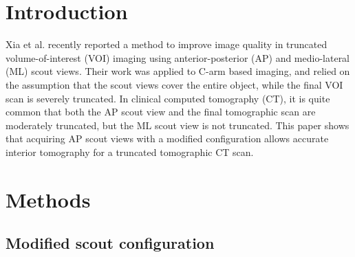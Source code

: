 \documentclass[]{spie}
\begin{document}
\tableofcontents
\setcounter{tocdepth}{0}



\section{Introduction}
\label{sec:introduction}

Xia et al. \cite{Xia2015} recently reported a method to improve image quality in truncated volume-of-interest (VOI) imaging using anterior-posterior (AP) and medio-lateral (ML) scout views. Their work was applied to C-arm based imaging, and relied on the assumption that the scout views cover the entire object, while the final VOI scan is severely truncated. In clinical computed tomography (CT), it is quite common that both the AP scout view and the final tomographic scan are moderately truncated, but the ML scout view is not truncated. This paper shows that acquiring AP scout views with a modified configuration allows accurate interior tomography for a truncated tomographic CT scan. 

\section{Methods}
\label{sec:methods}




\subsection{Modified scout configuration}
\label{ssec:modified_scout}
\end{document}
